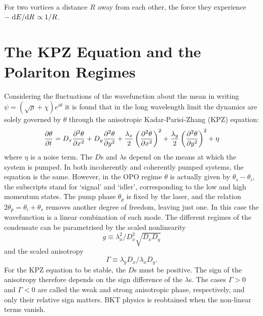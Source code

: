 \documentclass[letterpaper, 10 pt, conference]{IEEEtran}  %
\begin{document}
For two vortices a distance $R$ away from each other, the force they experience $-\dv*{E}{R} \propto 1/R$. 

\section{The KPZ Equation and the Polariton Regimes}

Considering the fluctuations of the wavefunction about the mean in writing $\psi = (\sqrt{\rho} + \chi)e^{i \theta}$ it is found \cite{2015PhRvX...5a1017A, PhysRevX.7.041006} that in the long wavelength limit the dynamics are solely governed by $\theta$ through the anisotropic Kadar-Parisi-Zhang (KPZ) equation:
\[
\pdv{\theta}{t} = D_x \pdv[2]{\theta}{x} + D_y \pdv[2]{\theta}{y} + \frac{\lambda_x}{2}\left ( \pdv[2]{\theta}{x} \right)^2 + \frac{\lambda_y}{2} \left (\pdv[2]{\theta}{y} \right)^2 + \eta
\]
where $\eta$ is a noise term. 
The $D$s and $\lambda$s depend on the means at which the system is pumped. 
In both incoherently and coherently pumped systems, the equation is the same. 
However, in the OPO regime $\theta$ is actually given by $\theta_s - \theta_i$, the subscripts stand for `signal' and `idler', corresponding to the low and high momentum states.
The pump phase $\theta_p$ is fixed by the laser, and the relation $2 \theta_p = \theta_i + \theta_s$ removes another degree of freedom, leaving just one.  
In this case the wavefunction is a linear combination of each mode.
The different regimes of the condensate can be parametrised by the scaled nonlinearity 
\[
g \equiv \lambda_x^2/D_x^2\sqrt{D_x D_y}
\]
and the scaled anisotropy 
\[
\Gamma \equiv \lambda_y D_x / \lambda_x D_y.
\] 
For the KPZ equation to be stable, the $D$s must be positive.
The sign of the anisotropy therefore depends on the sign difference of the $\lambda$s. 
The cases $\Gamma > 0$ and $\Gamma < 0$ are called the weak and strong anisotropic phase, respectively, and only their relative sign matters.
BKT physics is reobtained when the non-linear terms vanish.
\end{document}
